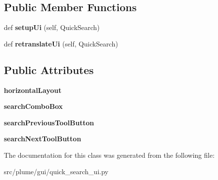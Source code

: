 \subsection*{Public Member Functions}
\begin{DoxyCompactItemize}
\item 
def {\bfseries setup\+Ui} (self, Quick\+Search)\hypertarget{classplume-creator_1_1src_1_1plume_1_1gui_1_1quick__search__ui_1_1_ui___quick_search_a04f6867b295686efc896d003593be81f}{}\label{classplume-creator_1_1src_1_1plume_1_1gui_1_1quick__search__ui_1_1_ui___quick_search_a04f6867b295686efc896d003593be81f}

\item 
def {\bfseries retranslate\+Ui} (self, Quick\+Search)\hypertarget{classplume-creator_1_1src_1_1plume_1_1gui_1_1quick__search__ui_1_1_ui___quick_search_accf20c560f2b265b480f22a549c69d7e}{}\label{classplume-creator_1_1src_1_1plume_1_1gui_1_1quick__search__ui_1_1_ui___quick_search_accf20c560f2b265b480f22a549c69d7e}

\end{DoxyCompactItemize}
\subsection*{Public Attributes}
\begin{DoxyCompactItemize}
\item 
{\bfseries horizontal\+Layout}\hypertarget{classplume-creator_1_1src_1_1plume_1_1gui_1_1quick__search__ui_1_1_ui___quick_search_af7aae9c51254be9155ce31043e0dcf6a}{}\label{classplume-creator_1_1src_1_1plume_1_1gui_1_1quick__search__ui_1_1_ui___quick_search_af7aae9c51254be9155ce31043e0dcf6a}

\item 
{\bfseries search\+Combo\+Box}\hypertarget{classplume-creator_1_1src_1_1plume_1_1gui_1_1quick__search__ui_1_1_ui___quick_search_acf09f3ddae85a024b3edc2daa2dce2b8}{}\label{classplume-creator_1_1src_1_1plume_1_1gui_1_1quick__search__ui_1_1_ui___quick_search_acf09f3ddae85a024b3edc2daa2dce2b8}

\item 
{\bfseries search\+Previous\+Tool\+Button}\hypertarget{classplume-creator_1_1src_1_1plume_1_1gui_1_1quick__search__ui_1_1_ui___quick_search_a5b08158687ea1e1fc2df546389d32ecb}{}\label{classplume-creator_1_1src_1_1plume_1_1gui_1_1quick__search__ui_1_1_ui___quick_search_a5b08158687ea1e1fc2df546389d32ecb}

\item 
{\bfseries search\+Next\+Tool\+Button}\hypertarget{classplume-creator_1_1src_1_1plume_1_1gui_1_1quick__search__ui_1_1_ui___quick_search_a3d99a09e923315816a2adf3da7336ceb}{}\label{classplume-creator_1_1src_1_1plume_1_1gui_1_1quick__search__ui_1_1_ui___quick_search_a3d99a09e923315816a2adf3da7336ceb}

\end{DoxyCompactItemize}


The documentation for this class was generated from the following file\+:\begin{DoxyCompactItemize}
\item 
src/plume/gui/quick\+\_\+search\+\_\+ui.\+py\end{DoxyCompactItemize}
